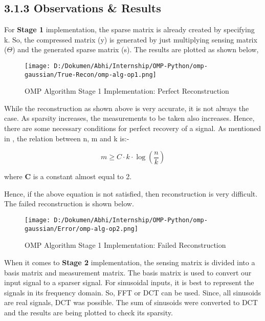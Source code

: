 \documentclass[
  letterpaper,
  DIV=11,
  numbers=noendperiod]{scrartcl}
\begin{document}
\subsection{3.1.3 Observations \& Results}\label{observations-results}

For \textbf{Stage 1} implementation, the sparse matrix is already
created by specifying k. So, the compressed matrix (y) is generated by
just multiplying sensing matrix (\(\Theta\)) and the generated sparse
matrix (s). The results are plotted as shown below,

\begin{figure}[H]

{\centering \texttt{[image: D:/Dokumen/Abhi/Internship/OMP-Python/omp-gaussian/True-Recon/omp-alg-op1.png]}

}

\caption{OMP Algorithm Stage 1 Implementation: Perfect Reconstruction}

\end{figure}%

While the reconstruction as shown above is very accurate, it is not
always the case. As sparsity increases, the measurements to be taken
also increases. Hence, there are some necessary conditions for perfect
recovery of a signal. As mentioned in \autocite{rani-cs}, the relation
between n, m and k is:-

\begin{equation}
\boxed{
    m \geq C \cdot k \cdot \log\left(\frac{n}{k}\right)
}
\end{equation}

where \textbf{C} is a constant almost equal to 2.

Hence, if the above equation is not satisfied, then reconstruction is
very difficult. The failed reconstruction is shown below.

\begin{figure}[H]

{\centering \texttt{[image: D:/Dokumen/Abhi/Internship/OMP-Python/omp-gaussian/Error/omp-alg-op2.png]}

}

\caption{OMP Algorithm Stage 1 Implementation: Failed Reconstruction}

\end{figure}%

When it comes to \textbf{Stage 2} implementation, the sensing matrix is
divided into a basis matrix and measurement matrix. The basis matrix is
used to convert our input signal to a sparser signal. For sinusoidal
inputs, it is best to represent the signals in its frequency domain. So,
FFT or DCT can be used. Since, all sinusoids are real signals, DCT was
possible. The sum of sinusoids were converted to DCT and the results are
being plotted to check its sparsity.
\end{document}
